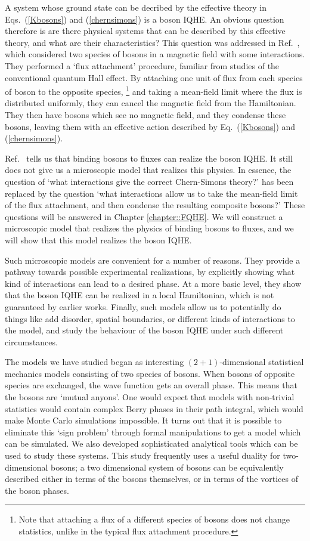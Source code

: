 A system whose ground state can be decribed by the effective theory in Eqs.~(\ref{Kbosons}) and (\ref{chernsimons}) is a boson IQHE. An obvious question therefore is are there physical systems that can be described by this effective theory, and what are their characteristics? This question was addressed in Ref.~\cite{SenthilLevin2012}, which considered two species of bosons in a magnetic field with some interactions. They performed a `flux attachment' procedure, familiar from studies of the conventional quantum Hall effect. By attaching one unit of flux from each species of boson to the opposite species,
\footnote{Note that attaching a flux of a different species of bosons does not change statistics, unlike in the typical flux attachment procedure.} 
and taking a mean-field limit where the flux is distributed uniformly, they can cancel the magnetic field from the Hamiltonian. They then have bosons which see no magnetic field, and they condense these bosons, leaving them with an effective action described by Eq.~(\ref{Kbosons}) and (\ref{chernsimons}). 

Ref.~\cite{SenthilLevin2012} tells us that binding bosons to fluxes can realize the boson IQHE. It still does not give us a microscopic model that realizes this physics. In essence, the question of `what interactions give the correct Chern-Simons theory?' has been replaced by the question `what interactions allow us to take the mean-field limit of the flux attachment, and then condense the resulting composite bosons?' These questions will be answered in Chapter \ref{chapter::FQHE}. We will construct a microscopic model that realizes the physics of binding bosons to fluxes, and we will show that this model realizes the boson IQHE.

Such microscopic models are convenient for a number of reasons. They provide a pathway towards possible experimental realizations, by explicitly showing what kind of interactions can lead to a desired phase. At a more basic level, they show that the boson IQHE can be realized in a local Hamiltonian, which is not guaranteed by earlier works. Finally, such models allow us to potentially do things like add disorder, spatial boundaries, or different kinds of interactions to the model, and study the behaviour of the boson IQHE under such different circumstances. 

The models we have studied began as interesting $(2+1)$-dimensional statistical mechanics models consisting of two species of bosons. When bosons of opposite species are exchanged, the wave function gets an overall phase. This means that the bosons are `mutual anyons'. One would expect that models with non-trivial statistics would contain complex Berry phases in their path integral, which would make Monte Carlo simulations impossible. It turns out that it is possible to eliminate this `sign problem' through formal manipulations to get a model which can be simulated. We also developed sophisticated analytical tools which can be used to study these systems. This study frequently uses a useful duality for two-dimensional bosons; a two dimensional system of bosons can be equivalently described either in terms of the bosons themselves, or in terms of the vortices of the boson phases.

